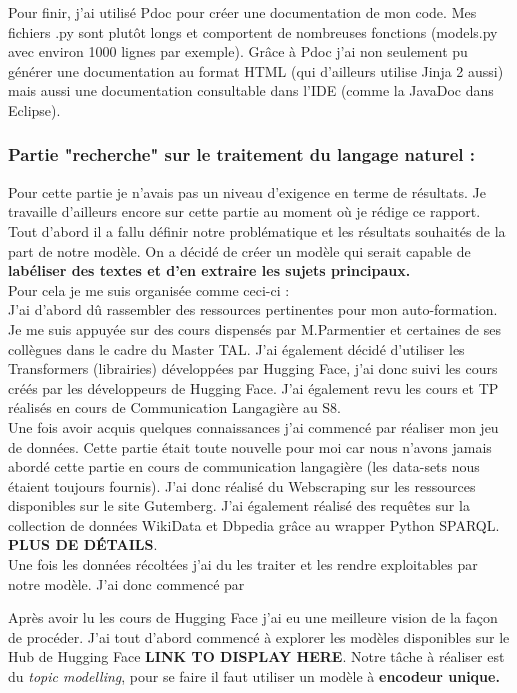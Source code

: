 \documentclass[12pt]{article}
\begin{document}
Pour finir, j'ai utilisé Pdoc pour créer une documentation de mon code. Mes fichiers .py sont plutôt longs et comportent de nombreuses fonctions (models.py avec environ 1000 lignes par exemple). Grâce à Pdoc j'ai non seulement pu générer une documentation au format HTML (qui d'ailleurs utilise Jinja 2 aussi) mais aussi une documentation consultable dans l'IDE (comme la JavaDoc dans Eclipse).


\subsubsection{Partie "recherche" sur le traitement du langage naturel :}

Pour cette partie je n'avais pas un niveau d'exigence en terme de résultats. Je travaille d'ailleurs encore sur cette partie au moment où je rédige ce rapport. \\
Tout d'abord il a fallu définir notre problématique et les résultats souhaités de la part de notre modèle. On a décidé de créer un modèle qui serait capable de \textbf{labéliser des textes et d'en extraire les sujets principaux.} \\

Pour cela je me suis organisée comme ceci-ci : \\
J'ai d'abord dû rassembler des ressources pertinentes pour mon auto-formation. Je me suis appuyée sur des cours dispensés par M.Parmentier et certaines de ses collègues dans le cadre du Master TAL. J'ai également décidé d'utiliser les Transformers (librairies) développées par Hugging Face, j'ai donc suivi les cours créés par les développeurs de Hugging Face. J'ai également revu les cours et TP réalisés en cours de Communication Langagière au S8. \\

Une fois avoir acquis quelques connaissances j'ai commencé par réaliser mon jeu de données. Cette partie était toute nouvelle pour moi car nous n'avons jamais abordé cette partie en cours de communication langagière (les data-sets nous étaient toujours fournis). J'ai donc réalisé du Webscraping sur les ressources disponibles sur le site Gutemberg. 
J'ai également réalisé des requêtes sur la collection de données WikiData et Dbpedia grâce au wrapper Python SPARQL. \textbf{PLUS DE DÉTAILS}. \\

Une fois les données récoltées j'ai du les traiter et les rendre exploitables par notre modèle. J'ai donc commencé par 

Après avoir lu les cours de Hugging Face j'ai eu une meilleure vision de la façon de procéder. J'ai tout d'abord commencé à explorer les modèles disponibles sur le Hub de Hugging Face \textbf{LINK TO DISPLAY HERE}. Notre tâche à réaliser est du \textit{topic modelling}, pour se faire il faut utiliser un modèle à \textbf{encodeur unique.} 
\end{document}
